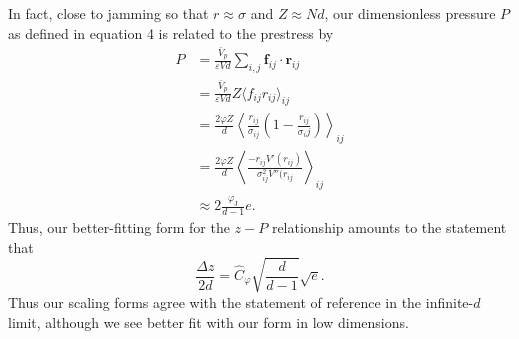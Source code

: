 In fact, close to jamming so that $r \approx \sigma$ and $Z \approx N d$, our dimensionless pressure $P$ as defined in equation 4
is related to the prestress by
%
\begin{align} P &= \frac{\bar{V}_p}{\varepsilon Vd} \sum_{i,j} \mathbf{f}_{ij} \cdot \mathbf{r}_{ij} \\
  &=\frac{\bar{V}_p}{\varepsilon Vd} Z \langle f_{ij} r_{ij} \rangle_{ij} \\
  &=\frac{2 \varphi Z}{ d}  \left\langle \frac{r_{ij}}{\sigma_{ij}} \left(1 - \frac{r_{ij}}{\sigma_ij}\right) \right\rangle_{ij}\\
  &= \frac{2 \varphi Z}{d}  \left\langle \frac{- r_{ij} V'(r_{ij})}{\sigma_{ij}^2V''(r_{ij}} \right\rangle_{ij} \\
&\approx 2\frac{ \varphi_{\mathrm{J}} }{d-1} e.
\end{align}
%
Thus, our better-fitting form for the $z-P$ relationship amounts to the statement that
%
  \begin{equation}
    \frac{\Delta z}{2 d} =  \hat{C}_\varphi   \sqrt{\frac{d}{d-1}} \sqrt{e}.
  \end{equation}
%
 Thus our scaling forms agree with the statement of reference \cite{shimada_low-frequency_2019} in the infinite-$d$ limit, although we see better fit with our form in low dimensions.




%

